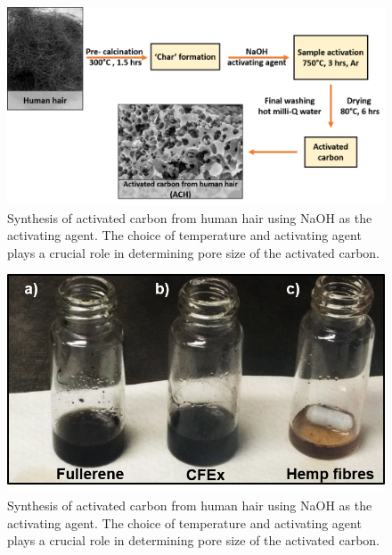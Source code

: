 \newcommand{\beginsupplement}{
               \setcounter{figure}{0}
        \renewcommand{\thefigure}{S\arabic{figure}}
     }
\beginsupplement
\begin{figure}[tbh!]
  \centering
  \includegraphics[width=\textwidth]{Figures/chap5fig/achsyn}
    \caption{Synthesis of activated carbon from human hair using NaOH as the activating agent. The choice of temperature and activating agent plays a crucial role in determining pore size of the activated carbon.}
  \label{Figures/chap5fig:achsyn}
\end{figure}
\begin{figure}[tbh!]
  \centering
  \includegraphics[width=\textwidth]{Figures/chap5fig/cfexsol}
    \caption{Synthesis of activated carbon from human hair using NaOH as the activating agent. The choice of temperature and activating agent plays a crucial role in determining pore size of the activated carbon.}
  \label{Figures/chap5fig:cfexsol}
\end{figure}
